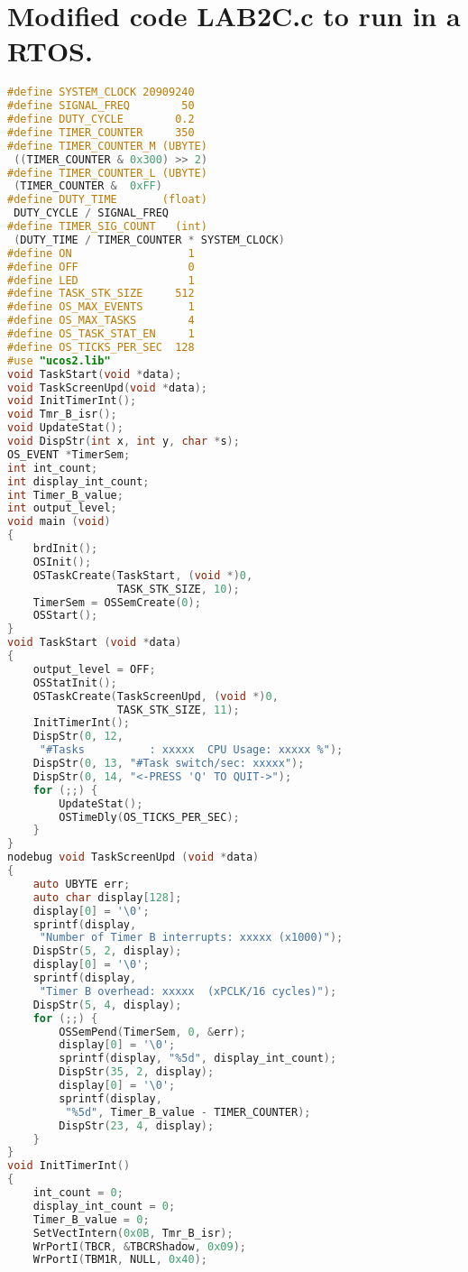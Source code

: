 \vfill \columnbreak
\section{Modified code LAB2C.c to run in a RTOS.}
\begin{lstlisting}[language=C]
#define SYSTEM_CLOCK 20909240
#define SIGNAL_FREQ        50
#define DUTY_CYCLE        0.2
#define TIMER_COUNTER     350
#define TIMER_COUNTER_M (UBYTE)
 ((TIMER_COUNTER & 0x300) >> 2)
#define TIMER_COUNTER_L (UBYTE)
 (TIMER_COUNTER &  0xFF)
#define DUTY_TIME       (float)
 DUTY_CYCLE / SIGNAL_FREQ
#define TIMER_SIG_COUNT   (int)
 (DUTY_TIME / TIMER_COUNTER * SYSTEM_CLOCK)
#define ON                  1
#define OFF                 0
#define LED                 1
#define TASK_STK_SIZE     512
#define OS_MAX_EVENTS       1
#define OS_MAX_TASKS        4
#define OS_TASK_STAT_EN     1
#define OS_TICKS_PER_SEC  128
#use "ucos2.lib"
void TaskStart(void *data);
void TaskScreenUpd(void *data);
void InitTimerInt();
void Tmr_B_isr();
void UpdateStat();
void DispStr(int x, int y, char *s);
OS_EVENT *TimerSem;
int int_count;
int display_int_count;
int Timer_B_value;
int output_level;
void main (void)
{
    brdInit();
    OSInit();
    OSTaskCreate(TaskStart, (void *)0,
                 TASK_STK_SIZE, 10);
    TimerSem = OSSemCreate(0);
    OSStart();
}
void TaskStart (void *data)
{
    output_level = OFF;
    OSStatInit();
    OSTaskCreate(TaskScreenUpd, (void *)0,
                 TASK_STK_SIZE, 11);
    InitTimerInt();
    DispStr(0, 12,
     "#Tasks          : xxxxx  CPU Usage: xxxxx %");
    DispStr(0, 13, "#Task switch/sec: xxxxx");
    DispStr(0, 14, "<-PRESS 'Q' TO QUIT->");
    for (;;) {
        UpdateStat();
        OSTimeDly(OS_TICKS_PER_SEC);
    }
}
nodebug void TaskScreenUpd (void *data)
{
    auto UBYTE err;
    auto char display[128];
    display[0] = '\0';
    sprintf(display,
     "Number of Timer B interrupts: xxxxx (x1000)");
    DispStr(5, 2, display);
    display[0] = '\0';
    sprintf(display,
     "Timer B overhead: xxxxx  (xPCLK/16 cycles)");
    DispStr(5, 4, display);
    for (;;) {
        OSSemPend(TimerSem, 0, &err);
        display[0] = '\0';
        sprintf(display, "%5d", display_int_count);
        DispStr(35, 2, display);
        display[0] = '\0';
        sprintf(display,
         "%5d", Timer_B_value - TIMER_COUNTER);
        DispStr(23, 4, display);
    }
}
void InitTimerInt()
{
    int_count = 0;
    display_int_count = 0;
    Timer_B_value = 0;
    SetVectIntern(0x0B, Tmr_B_isr);
    WrPortI(TBCR, &TBCRShadow, 0x09);
    WrPortI(TBM1R, NULL, 0x40);

\end{lstlisting}
